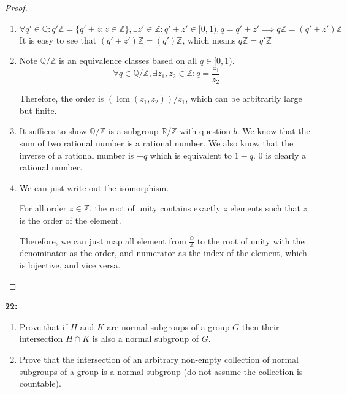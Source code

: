 \documentclass[11pt]{article}
\newcommand{\Q}{\mathbb{Q}}
\newcommand{\R}{\mathbb{R}}
\newcommand{\Z}{\mathbb{Z}}
\newenvironment{exercise}[1]
	{\noindent \textbf{#1:}}
	{\par \vspace{0.5\baselineskip}}
\begin{document}
\begin{proof}
	\begin{enumerate}[label=\emph{\alph*}]
		\item \[
			      \forall q' \in \Q: q'\Z = \{q'+z : z \in \Z\}, \exists z' \in \Z: q'+z' \in [0,1), q = q'+z' \implies q\Z = (q'+z')\Z
		      \]
		      It is easy to see that $(q'+z')\Z = (q')\Z$, which means $q\Z=q'\Z$
		\item Note $\Q/\Z$ is an equivalence classes based on all $q \in [0,1)$.
		      \[
			      \forall q \in \Q/\Z, \exists z_1,z_2 \in \Z: q = \frac{z_1}{z_2}
		      \]

		      Therefore, the order is $(\operatorname{lcm} (z_1,z_2))/z_1$, which can be arbitrarily large but finite.

		\item It suffices to show $\Q/\Z$ is a subgroup $\R/\Z$ with question $b$.
		      We know that the sum of two rational number is a rational number.
		      We also know that the inverse of a rational number is $-q$ which is equivalent to $1-q$.
		      $0$ is clearly a rational number.
		\item We can just write out the isomorphism.

		      For all order $z \in \Z$, the root of unity contains exactly $z$ elements such that $z$ is the order of the element.

		      Therefore, we can just map all element from $\frac{\Q}{\Z}$ to the root of unity with the denominator as the order,
		      and numerator as the index of the element, which is bijective, and vice versa.

	\end{enumerate}
\end{proof}

\begin{exercise}{22}
	\begin{enumerate}[label=\emph{\alph*}]
		\item \textsf{Prove that if \(H\) and \(K\) are normal subgroups of a group \(G\) then their intersection \(H \cap K\) is also a normal subgroup of \(G\).}
		\item \textsf{Prove that the intersection of an arbitrary non-empty collection of normal subgroups of a group is a normal subgroup (do not assume the collection is countable).}
	\end{enumerate}
\end{exercise}{}
\end{document}
